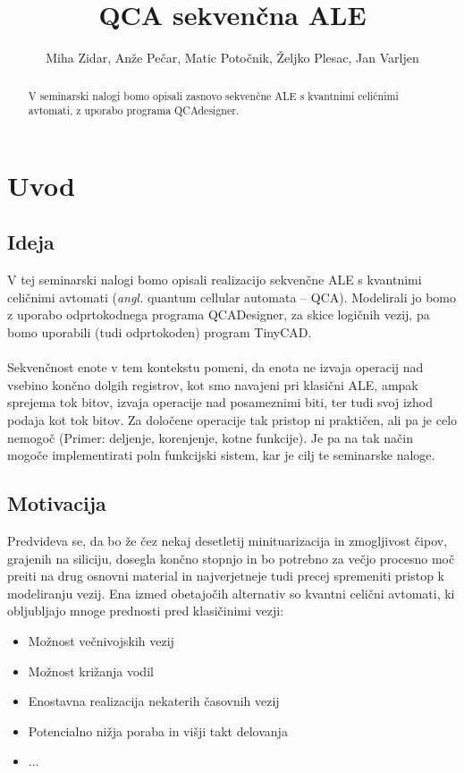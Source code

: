 \documentclass[seminar, slovene]{FRIreport}
\newcommand{\angl}[1]{(\textit{angl.} #1)}
\begin{document}
\title{QCA sekven\v cna ALE}

\author{Miha Zidar, Anže Pečar, Matic Potočnik, Željko Plesac, Jan Varljen}

\address{Skupina 2 in 4}

\begin{abstract}
V seminarski nalogi bomo opisali zasnovo sekvenčne ALE s kvantnimi celičnimi avtomati, z uporabo programa QCAdesigner.

\end{abstract}

%
\section{Uvod}
\subsection{Ideja}
V tej seminarski nalogi bomo opisali realizacijo sekvenčne ALE s kvantnimi celičnimi avtomati \angl{quantum cellular automata -- QCA}. Modelirali jo bomo z uporabo odprtokodnega programa QCADesigner\cite{walus:2004}, za skice logičnih vezij, pa bomo uporabili (tudi odprtokoden) program TinyCAD.
\ \\ \ \\
Sekvenčnost enote v tem kontekstu pomeni, da enota ne izvaja operacij nad vsebino končno dolgih registrov, kot smo navajeni pri klasični ALE, ampak sprejema tok bitov, izvaja operacije nad posameznimi biti, ter tudi svoj izhod podaja kot tok bitov. Za določene operacije tak pristop ni praktičen, ali pa je celo nemogoč (Primer: deljenje, korenjenje, kotne funkcije). Je pa na tak način mogoče implementirati poln funkcijski sistem, kar je cilj te seminarske naloge.

\subsection{Motivacija}
Predvideva se, da bo že čez nekaj desetletij minituarizacija in zmogljivost čipov, grajenih na siliciju, dosegla končno stopnjo in bo potrebno za večjo procesno moč preiti na drug osnovni material in najverjetneje tudi precej spremeniti pristop k modeliranju vezij. Ena izmed obetajočih alternativ so kvantni celični avtomati, ki obljubljajo mnoge prednosti pred klasičinimi vezji:
\begin{itemize}
\item Možnost večnivojskih vezij
\item Možnost križanja vodil
\item Enostavna realizacija nekaterih časovnih vezij
\item Potencialno nižja poraba in višji takt delovanja
\item $\dots$
\end{itemize}
\pagebreak
%
\end{document}
